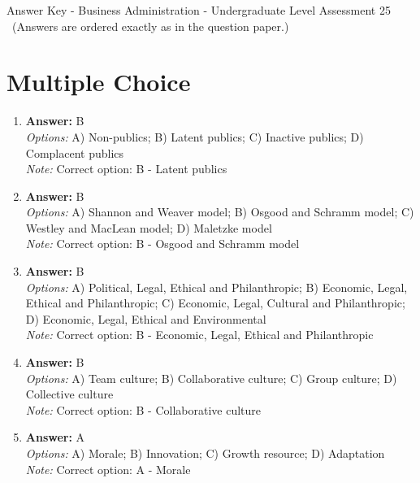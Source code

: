 \documentclass[12pt]{article}
\begin{document}
\begin{center}
Answer Key - Business Administration - Undergraduate Level Assessment 25 \
\small (Answers are ordered exactly as in the question paper.)
\end{center}

\section*{Multiple Choice}
\begin{enumerate}[label=\arabic*.]
\item \textbf{Answer:} B
\\ \textit{Options:} A) Non-publics; B) Latent publics; C) Inactive publics; D) Complacent publics
\\ \textit{Note:} Correct option: B - Latent publics
\item \textbf{Answer:} B
\\ \textit{Options:} A) Shannon and Weaver model; B) Osgood and Schramm model; C) Westley and MacLean model; D) Maletzke model
\\ \textit{Note:} Correct option: B - Osgood and Schramm model
\item \textbf{Answer:} B
\\ \textit{Options:} A) Political, Legal, Ethical and Philanthropic; B) Economic, Legal, Ethical and Philanthropic; C) Economic, Legal, Cultural and Philanthropic; D) Economic, Legal, Ethical and Environmental
\\ \textit{Note:} Correct option: B - Economic, Legal, Ethical and Philanthropic
\item \textbf{Answer:} B
\\ \textit{Options:} A) Team culture; B) Collaborative culture; C) Group culture; D) Collective culture
\\ \textit{Note:} Correct option: B - Collaborative culture
\item \textbf{Answer:} A
\\ \textit{Options:} A) Morale; B) Innovation; C) Growth resource; D) Adaptation
\\ \textit{Note:} Correct option: A - Morale
\end{enumerate}
\end{document}
